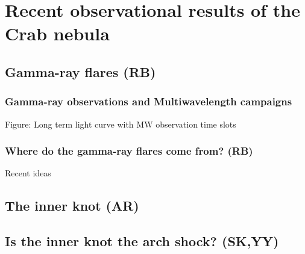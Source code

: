 \section{Recent observational results of the Crab nebula}
\subsection{Gamma-ray flares (RB)}
\subsubsection{Gamma-ray observations and Multiwavelength campaigns}
Figure: Long term light curve with MW observation time slots
\subsubsection{Where do the gamma-ray flares come from?                  (RB)}
Recent ideas  \cite{2016arXiv160403179Y}\cite{2015arXiv151205426Z}\cite{2016arXiv160304850N}\cite{2016arXiv160305731L}
\subsection{The inner knot   (AR)}
\subsection{Is the inner knot the arch shock?                                      (SK,YY)}
